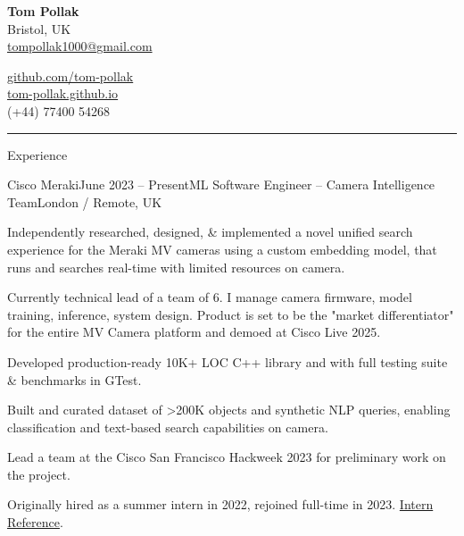 \documentclass{structure}
\begin{document}
\parbox{0.5\textwidth}{
    {\namesize\textbf{Tom Pollak}} \\[6pt]
    Bristol, UK\\
    \href{mailto:tompollak1000@gmail.com}{tompollak1000@gmail.com}
}
\hfill
\parbox{0.5\textwidth}{
    \vspace*{10pt}

    \begin{flushright}

        \href{https://github.com/tom-pollak}{github.com/tom-pollak} \\
        \href{https://tom-pollak.github.io}{tom-pollak.github.io} \\
        (+44) 77400 54268
    \end{flushright}

}

\smallskip
\hrule
\smallskip


\begin{rSection}{Experience}

    \begin{rSubsection}{Cisco Meraki}{June 2023 -- Present}{ML Software Engineer -- Camera Intelligence Team}{London / Remote, UK}{}{}
        \item Independently researched, designed, \& implemented a novel unified search experience for the Meraki MV cameras using a custom embedding model, that runs and searches real-time with limited resources on camera.

        \item Currently technical lead of a team of 6. I manage camera firmware, model training, inference, system design. Product is set to be the "market differentiator" for the entire MV Camera platform and demoed at Cisco Live 2025.

        \item Developed production-ready 10K+ LOC C++ library and with full testing suite \& benchmarks in GTest.

        \item Built and curated dataset of >200K objects and synthetic NLP queries, enabling classification and text-based search capabilities on camera.

        \item Lead a team at the Cisco San Francisco Hackweek 2023 for preliminary work on the project.

        \item Originally hired as a summer intern in 2022, rejoined full-time in 2023. \href{https://gist.githubusercontent.com/tom-pollak/1a2e8c1fc61ba269e25c73c02c78007c/raw/45c8cbceda8cd745d6d00cb16a09979778df663b/gistfile1.txt}{{\color{blue}Intern Reference}}.
    \end{rSubsection}

\end{rSection}
\end{document}

